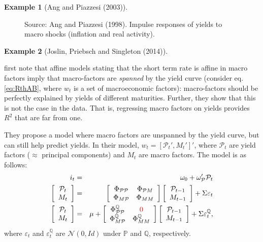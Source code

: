 \documentclass[
  12pt,
]{book}
\theoremstyle{definition}
\theoremstyle{definition}
\newtheorem{example}{Example}[chapter]
\theoremstyle{definition}
\theoremstyle{definition}
\theoremstyle{remark}
\begin{document}
\begin{example}[Ang and Piazzesi (2003)]
\begin{figure}
{}

\caption{Source: Ang and Piazzesi (1998). Impulse responses of yields to macro shocks (inflation and real activity).}\label{fig:figAngPiazzesi}
\end{figure}

\end{example}

\begin{example}[Joslin, Priebsch and Singleton (2014)]
\protect\hypertarget{exm:JPS}{}\label{exm:JPS}

\citet{Joslin_Priebsch_Singleton_2014} first note that affine models stating that the short term rate is affine in macro factors imply that macro-factors are \emph{spanned} by the yield curve (consider eq. \eqref{eq:RthAB}, where \(w_t\) is a set of macroeconomic factors): macro-factors should be perfectly explained by yields of different maturities. Further, they show that this is not the case in the data. That is, regressing macro factors on yields provides \(R^2\) that are far from one.

They propose a model where macro factors are unspanned by the yield curve, but can still help predict yields. In their model, \(w_t = [\mathcal{P}_t',M_t']'\), where \(\mathcal{P}_t\) are yield factors (\(\approx\) principal components) and \(M_t\) are macro factors. The model is as follows:
\begin{eqnarray*}
i_t &=& \omega_{0} + \omega_{\mathcal{P}}'\mathcal{P}_t \\
\left[\begin{array}{c}\mathcal{P}_t \\ M_t \end{array}\right]
&=&
\left[\begin{array}{cc}\Phi_{\mathcal{P}\mathcal{P}}&\Phi_{\mathcal{P}M} \\
\Phi_{M\mathcal{P}}&\Phi_{MM} \end{array}\right]
\left[\begin{array}{c}\mathcal{P}_{t-1} \\ M_{t-1} \end{array}\right] + \Sigma \varepsilon_t \\
\left[\begin{array}{c}\mathcal{P}_t \\ M_t \end{array}\right] &=& \mu +
\left[\begin{array}{cc}\Phi^{\mathbb{Q}}_{\mathcal{P}\mathcal{P}}&{\color{red}0} \\
\Phi^{\mathbb{Q}}_{M\mathcal{P}}&\Phi^{\mathbb{Q}}_{MM} \end{array}\right]
\left[\begin{array}{c}\mathcal{P}_{t-1} \\ M_{t-1} \end{array}\right] + \Sigma \varepsilon^{\mathbb{Q}}_t,
\end{eqnarray*}
where \(\varepsilon_t\) and \(\varepsilon^{\mathbb{Q}}_t\) are \(\mathcal{N}(0,Id)\) under \(\mathbb{P}\) and \(\mathbb{Q}\), respectively.


\end{example}
\end{document}
